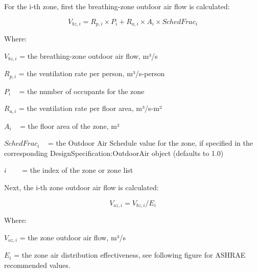 For the i-th zone, first the breathing-zone outdoor air flow is calculated:

\begin{equation}
{V_{bz,i}} = {R_{p,i}} \times {P_i} + {R_{a,i}} \times {A_i} \times {SchedFrac_i}
\end{equation}

Where:

\({V_{bz,i}}\) = the breathing-zone outdoor air flow, m³/s

\({R_{p,i}}\) = the ventilation rate per person, m³/s-person

\({P_i}\) ~ = the number of occupants for the zone

\({R_{a,i}}\) = the ventilation rate per floor area, m³/s-m²

\({A_i}\) ~ = the floor area of the zone, m²

\({SchedFrac_i}\) ~ = the Outdoor Air Schedule value for the zone, if specified in the corresponding DesignSpecification:OutdoorAir object (defaults to 1.0)

\(i\) ~~~ = the index of the zone or zone list

Next, the i-th zone outdoor air flow is calculated:

\begin{equation}
{V_{oz,i}} = {V_{bz,i}}/{E_i}
\end{equation}

Where:

\({V_{oz,i}}\) = the zone outdoor air flow, m³/s

\({E_i}\) = the zone air distribution effectiveness, see following figure for ASHRAE recommended values.

